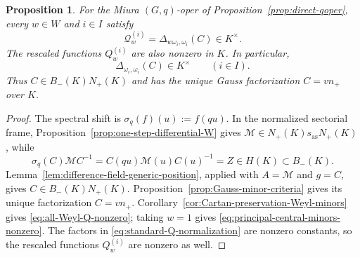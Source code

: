 \documentclass[11pt,leqno]{amsart}
\numberwithin{equation}{section}
\theoremstyle{plain}
\newtheorem{proposition}[theorem]{Proposition}
\theoremstyle{definition}
\theoremstyle{plain}
\theoremstyle{definition}
\theoremstyle{remark}
\begin{document}
\begin{proposition}\label{prop:central-principal-nonvanishing}\label{prop:Bruhat-Q-nonvanishing}
For the Miura $(G,q)$-oper of Proposition~\ref{prop:direct-qoper}, every $w\in W$ and $i\in I$ satisfy
\begin{equation}\label{eq:all-Weyl-Q-nonzero}
 \mathcal Q_w^{(i)}
 =\Delta_{w\omega_i,\omega_i}(C)\in K^\times.
\end{equation}
The rescaled functions $Q_w^{(i)}$ are also nonzero in $K$.  In particular,
\begin{equation}\label{eq:principal-central-minors-nonzero}
 \Delta_{\omega_i,\omega_i}(C)\in K^\times
 \qquad(i\in I).
\end{equation}
Thus $C\in B_-(K)N_+(K)$ and has the unique Gauss factorization $C=vn_+$ over $K$.
\end{proposition}

\begin{proof}
The spectral shift is $\sigma_q(f)(u):=f(qu)$.  In the normalized sectorial frame,
Proposition~\ref{prop:one-step-differential-W} gives
$\mathscr M\in N_+(K)s_{\mathrm{as}} N_+(K)$, while
\[
 \sigma_q(C)\mathscr M C^{-1}=C(qu)\mathscr M(u)C(u)^{-1}=Z\in H(K)\subset B_-(K).
\]
Lemma~\ref{lem:difference-field-generic-position}, applied with $A=\mathscr M$ and $g=C$, gives $C\in B_-(K)N_+(K)$.  Proposition~\ref{prop:Gauss-minor-criteria} gives its unique factorization $C=vn_+$.  Corollary~\ref{cor:Cartan-preservation-Weyl-minors} gives \eqref{eq:all-Weyl-Q-nonzero}; taking $w=1$ gives \eqref{eq:principal-central-minors-nonzero}.  The factors in \eqref{eq:standard-Q-normalization} are nonzero constants, so the rescaled functions $Q_w^{(i)}$ are nonzero as well.
\end{proof}
\end{document}
